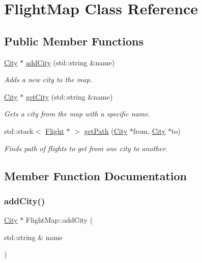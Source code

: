 \hypertarget{class_flight_map}{}\section{Flight\+Map Class Reference}
\label{class_flight_map}
\subsection*{Public Member Functions}
\begin{DoxyCompactItemize}
\item 
\hyperlink{struct_city}{City} $\ast$ \hyperlink{class_flight_map_a94ebe8b02bed441e429bb485680a964e}{add\+City} (std\+::string \&name)
\begin{DoxyCompactList}\small\item\em Adds a new city to the map. \end{DoxyCompactList}\item 
\hyperlink{struct_city}{City} $\ast$ \hyperlink{class_flight_map_a96d6d4164fa2a37584863a5e27d42fe3}{get\+City} (std\+::string \&name)
\begin{DoxyCompactList}\small\item\em Gets a city from the map with a specific name. \end{DoxyCompactList}\item 
std\+::stack$<$ \hyperlink{struct_flight}{Flight} $\ast$ $>$ \hyperlink{class_flight_map_a91f8ec291a0305ddccc64dd208e34113}{get\+Path} (\hyperlink{struct_city}{City} $\ast$from, \hyperlink{struct_city}{City} $\ast$to)
\begin{DoxyCompactList}\small\item\em Finds path of flights to get from one city to another. \end{DoxyCompactList}\end{DoxyCompactItemize}


\subsection{Member Function Documentation}
\mbox{\label{class_flight_map_a94ebe8b02bed441e429bb485680a964e}} 
\subsubsection{\texorpdfstring{add\+City()}{addCity()}}
{\footnotesize\ttfamily \hyperlink{struct_city}{City} $\ast$ Flight\+Map\+::add\+City (\begin{DoxyParamCaption}\item[{std\+::string \&}]{name }\end{DoxyParamCaption})}



